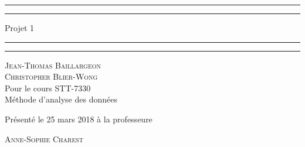 \begin{titlepage}
	\centering %
	
	\scshape %
	
	\vspace*{\baselineskip} %
	
	
	\rule{\textwidth}{1.6pt}\vspace*{-\baselineskip}\vspace*{2pt} %
	\rule{\textwidth}{0.4pt} %
	
	\vspace{0.75\baselineskip} %
	
	{\LARGE Projet 1\\} %
	
	\vspace{0.75\baselineskip} %
	
	\rule{\textwidth}{0.4pt}\vspace*{-\baselineskip}\vspace{3.2pt} %
	\rule{\textwidth}{1.6pt} %
	
	\vspace{2\baselineskip} %
	
	{\scshape\Large Jean-Thomas Baillargeon \\Christopher Blier-Wong\\} %
	Pour le cours STT-7330\\
	Méthode d'analyse des données %
	
	\vspace*{3\baselineskip} %
	
	
	Présenté le 25 mars 2018 à la professeure
	
	\vspace{0.5\baselineskip} %
	
	{\scshape\Large Anne-Sophie Charest \\} %
	

\end{titlepage}
